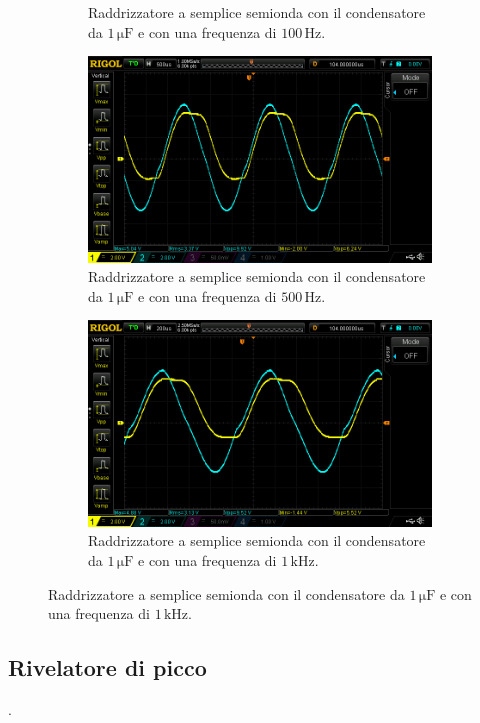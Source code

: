 \documentclass[a4paper]{article}
\begin{document}
{{\begin{figure}[h!]
\begin{subfigure}{0.4\textwidth}
						\caption{Raddrizzatore a semplice semionda con il condensatore da $ 1 \, \mathrm{\mu F} $ e con una frequenza di $ 100 \, \mathrm{Hz} $.}
					\end{subfigure}
					\begin{subfigure}{0.4\textwidth}
						\centering
						\includegraphics[scale=0.2]{raddrizzatoreASempliceSemionda1micro500}
						\caption{Raddrizzatore a semplice semionda con il condensatore da $ 1 \, \mathrm{\mu F} $ e con una frequenza di $ 500 \, \mathrm{Hz} $.}
					\end{subfigure}
					\begin{subfigure}{1\textwidth}
						\centering
						\includegraphics[scale=0.3]{raddrizzatoreASempliceSemionda1micro1k}
						\caption{Raddrizzatore a semplice semionda con il condensatore da $ 1 \, \mathrm{\mu F} $ e con una frequenza di $ 1 \, \mathrm{kHz} $.}
					\end{subfigure}
					\label{fig:raddrizzatoreASempliceSemionda1micro}
				\end{figure}
				\newpage
		\subsection{Rivelatore di picco}
			.
}}
\end{document}
